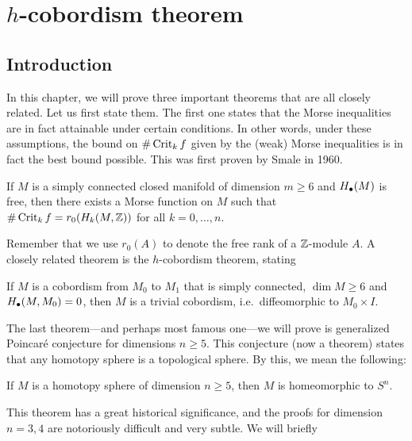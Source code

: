 \chapter{$h$-cobordism theorem}
\section{Introduction}

In this chapter, we will prove three important theorems that are all closely related.
Let us first state them.
The first one states that the Morse inequalities are in fact attainable under certain conditions.
In other words, under these assumptions, the bound on $\# \operatorname{Crit}_k f$ given by the (weak) Morse inequalities is in fact the best bound possible. This was first proven by Smale in 1960.
\begin{theorem}
    If $M$ is a simply connected closed manifold of dimension  $m \ge  6$ and $H_\bullet(M)$ is free, then there exists a Morse function on  $M$ such that  $\# \operatorname{Crit}_k f = r_0(H_k(M, \mathbb{Z}))$ for all $k = 0, \ldots, n$.
\end{theorem}
Remember that we use $r_0(A)$ to denote the free rank of a $\mathbb{Z}$-module $A$.
A closely related theorem is the $h$-cobordism theorem, stating
\begin{theorem}
    If $M$ is a cobordism from $M_0$ to $M_1$ that is simply connected, $\dim M \ge 6$ and $H_{\bullet}(M,M_0) = 0$, then $M$ is a trivial cobordism, i.e.\ diffeomorphic to  $ M_0 \times I$.
\end{theorem}
The last theorem---and perhaps most famous one---we will prove is generalized Poincaré conjecture for dimensions $n \ge 5$.
This conjecture (now a theorem) states that any homotopy sphere is a topological sphere. By this, we mean the following:
\begin{theorem}
    If $M$ is a homotopy sphere of dimension  $n \ge 5$, then $M$ is homeomorphic to  $S^{n}$.
\end{theorem}
This theorem has a great historical significance, and the proofs for dimension $n = 3, 4$ are notoriously difficult and very subtle. We will briefly 

